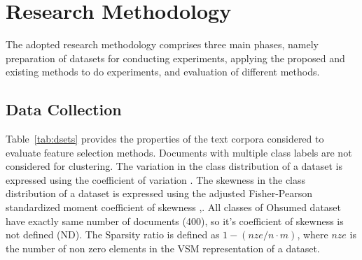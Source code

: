 \chapter{Research Methodology}
The adopted research methodology comprises three main phases, namely preparation of datasets for conducting experiments, applying the proposed and existing methods to do experiments, and evaluation of different methods.

\setcounter{equation}{0}

\section{Data Collection}
Table~\ref{tab:dsets} provides the properties of the text corpora considered to evaluate feature selection methods. Documents with multiple class labels are not considered for clustering. The variation in the class distribution of a dataset is expressed using the coefficient of variation \cite{ram2020}. The skewness in the class distribution of a dataset is expressed using the adjusted Fisher-Pearson standardized moment coefficient of skewness \cite{weltman2018},\cite{kovchegov2020}. All classes of Ohsumed dataset have exactly same number of documents (400), so it's coefficient of skewness is not defined (ND). The Sparsity ratio is defined as $1-(nze/n \cdot m)$, where $nze$ is the number of non zero elements in the VSM representation of a dataset.


